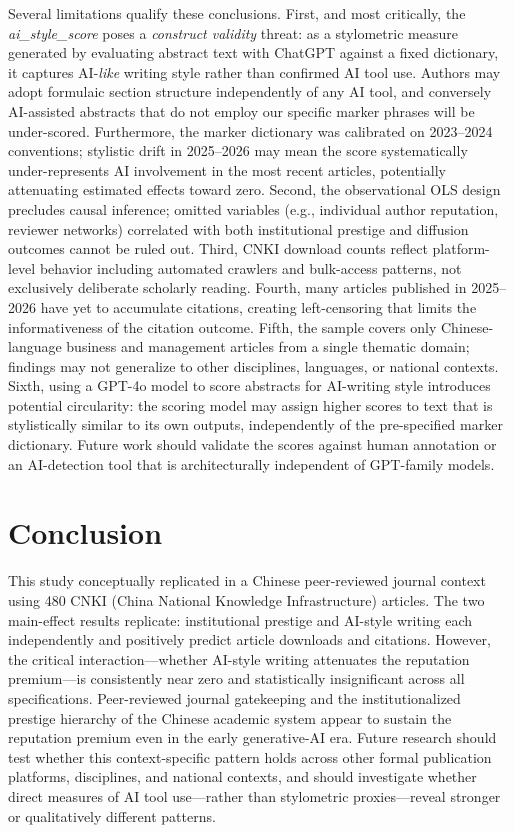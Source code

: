 \documentclass[12pt,a4paper]{article}
\begin{document}
Several limitations qualify these conclusions.
First, and most critically, the \textit{ai\_style\_score} poses a
\textit{construct validity} threat: as a stylometric measure generated
by evaluating abstract text with ChatGPT against a fixed dictionary,
it captures AI-\textit{like} writing style rather than confirmed
AI tool use.
Authors may adopt formulaic section structure independently of any AI
tool, and conversely AI-assisted abstracts that do not employ
our specific marker phrases will be under-scored.
Furthermore, the marker dictionary was calibrated on 2023--2024
conventions; stylistic drift in 2025--2026 may mean the score
systematically under-represents AI involvement in the most recent
articles, potentially attenuating estimated effects toward zero.
Second, the observational OLS design precludes causal inference;
omitted variables (e.g., individual author reputation, reviewer networks)
correlated with both institutional prestige and diffusion outcomes
cannot be ruled out.
Third, CNKI download counts reflect platform-level behavior including
automated crawlers and bulk-access patterns, not exclusively deliberate
scholarly reading.
Fourth, many articles published in 2025--2026 have yet to accumulate
citations, creating left-censoring that limits the informativeness of
the citation outcome.
Fifth, the sample covers only Chinese-language business and management
articles from a single thematic domain; findings may not generalize
to other disciplines, languages, or national contexts.
Sixth, using a GPT-4o model to score abstracts for AI-writing style
introduces potential circularity: the scoring model may assign higher
scores to text that is stylistically similar to its own outputs,
independently of the pre-specified marker dictionary.
Future work should validate the scores against human annotation or
an AI-detection tool that is architecturally independent of GPT-family
models.

\section{Conclusion}
\label{sec:conclusion}

This study conceptually replicated \citet{JoLi2026} in a Chinese
peer-reviewed journal context using 480 CNKI
(China National Knowledge Infrastructure) articles.
The two main-effect results replicate: institutional prestige and
AI-style writing each independently and positively predict article
downloads and citations.
However, the critical interaction---whether AI-style writing attenuates
the reputation premium---is consistently near zero and statistically
insignificant across all specifications.
Peer-reviewed journal gatekeeping and the institutionalized prestige
hierarchy of the Chinese academic system appear to sustain the
reputation premium even in the early generative-AI era.
Future research should test whether this context-specific pattern holds
across other formal publication platforms, disciplines, and national
contexts, and should investigate whether direct measures of AI tool
use---rather than stylometric proxies---reveal stronger or
qualitatively different patterns.
\end{document}
